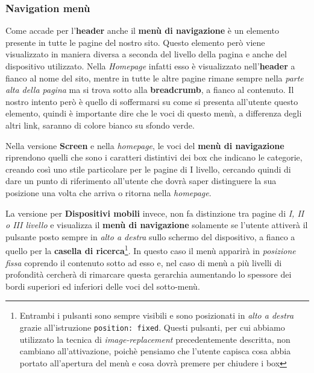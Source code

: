 \subsubsection{Navigation menù}\label{sec:Pres-Nav}
Come accade per l'\textbf{header} anche il \textbf{menù di navigazione} è un
elemento presente in tutte le pagine del nostro sito. Questo elemento però
viene visualizzato in maniera diversa a seconda del livello della pagina e
anche del dispositivo utilizzato. Nella \textit{Homepage} infatti esso è
visualizzato nell'\textbf{header} a fianco al nome del sito, mentre in tutte
le altre pagine rimane sempre nella \textit{parte alta della pagina} ma si
trova sotto alla \textbf{breadcrumb}, a fianco al contenuto. Il nostro intento
però è quello di soffermarsi su come si presenta all'utente questo elemento,
quindi è importante dire che le voci di questo menù, a differenza degli altri
link, saranno di colore bianco su sfondo verde.

Nella versione \textbf{Screen} e nella \textit{homepage}, le voci del
\textbf{menù di navigazione} riprendono quelli che sono i caratteri distintivi
dei box che indicano le categorie, creando così uno stile particolare per le
pagine di I livello, cercando quindi di dare un punto di riferimento
all'utente che dovrà saper distinguere la sua posizione una volta che arriva o
ritorna nella \textit{homepage}.

La versione per \textbf{Dispositivi mobili} invece, non fa distinzione tra
pagine di \textit{I, II o III livello} e visualizza il \textbf{menù di
navigazione} solamente se l'utente attiverà il pulsante posto sempre in
\textit{alto a destra} sullo schermo del dispositivo, a fianco a quello per la
\textbf{casella di ricerca}\footnote{Entrambi i pulsanti sono sempre visibili
e sono posizionati in \textit{alto a destra} grazie all'istruzione
\texttt{position: fixed}. Questi pulsanti, per cui abbiamo utilizzato la
tecnica di \textit{image-replacement} precedentemente descritta, non cambiano
all'attivazione, poichè pensiamo che l'utente capisca cosa abbia portato
all'apertura del menù e cosa dovrà premere per chiudere i box}. In questo caso
il menù apparirà in \textit{posizione fissa} coprendo il contenuto sotto ad
esso e, nel caso di menù a più livelli di profondità cercherà di rimarcare
questa gerarchia aumentando lo spessore dei bordi superiori ed inferiori delle
voci del sotto-menù.

